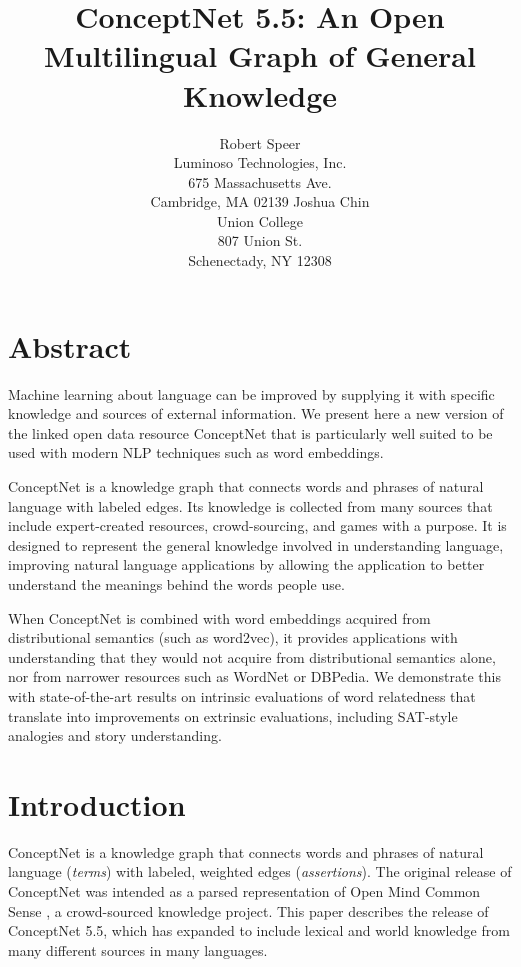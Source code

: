 \documentclass[letterpaper]{article}
\begin{document}
\title{ConceptNet 5.5: An Open Multilingual Graph of General Knowledge}
\author{
    Robert Speer \\ Luminoso Technologies, Inc. \\ 675 Massachusetts Ave. \\ Cambridge, MA 02139
    \And
    Joshua Chin \\ Union College \\ 807 Union St. \\ Schenectady, NY 12308
}

\maketitle


\section{Abstract}\label{abstract}

Machine learning about language can be improved by supplying it with specific
knowledge and sources of external information. We present here a new version
of the linked open data resource ConceptNet that is particularly well suited
to be used with modern NLP techniques such as word embeddings.

ConceptNet is a knowledge graph that connects words and phrases of natural
language with labeled edges. Its knowledge is collected from many sources that
include expert-created resources, crowd-sourcing, and games with a purpose. It
is designed to represent the general knowledge involved in understanding
language, improving natural language applications by allowing the application
to better understand the meanings behind the words people use.

When ConceptNet is combined with word embeddings acquired from distributional
semantics (such as word2vec), it provides applications with understanding that
they would not acquire from distributional semantics alone, nor from narrower
resources such as WordNet or DBPedia. We demonstrate this with state-of-the-art
results on intrinsic evaluations of word relatedness that translate into
improvements on extrinsic evaluations, including SAT-style analogies and story
understanding.


\section{Introduction}\label{introduction}

ConceptNet is a knowledge graph that connects words and phrases of
natural language (\emph{terms}) with labeled, weighted edges
(\emph{assertions}). The original release of ConceptNet \cite{liu2004conceptnet}
was intended as a parsed representation of Open Mind Common Sense
\cite{singh2002omcs}, a crowd-sourced knowledge project. This paper
describes the release of ConceptNet 5.5, which has expanded to include
lexical and world knowledge from many different sources in many
languages.
\end{document}
